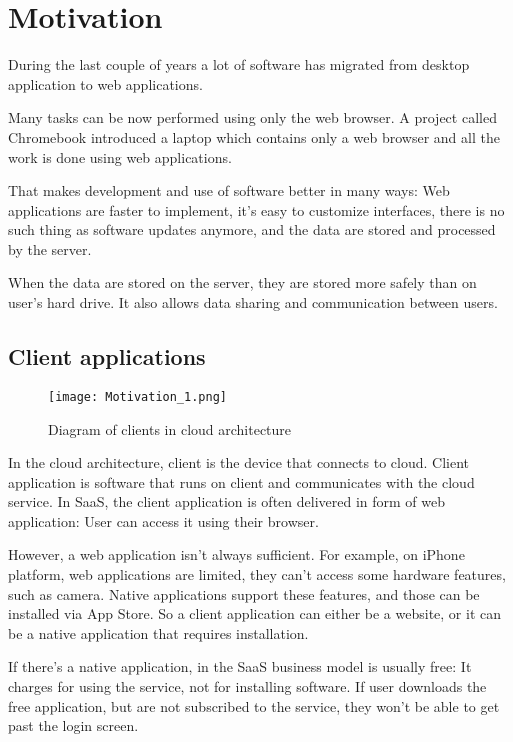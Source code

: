 \section{Motivation}

During the last couple of years a lot of software has migrated from desktop application to web applications.

Many tasks can be now performed using only the web browser. A project called Chromebook \citep{chromebook} introduced a laptop which contains only a web browser and all the work is done using web applications.

That makes development and use of software better in many ways: Web applications are faster to implement, it’s easy to customize interfaces, there is no such thing as software updates anymore, and the data are stored and processed by the server.

When the data are stored on the server, they are stored more safely than on user's hard drive. It also allows data sharing and communication between users.

\subsection{Client applications}

\begin{figure}[ht!]
\centering
\texttt{[image: Motivation\_1.png]}
\caption{Diagram of clients in cloud architecture \label{fig:1}}
\end{figure}

In the cloud architecture, client is the device that connects to cloud. Client application is software that runs on client and communicates with the cloud service. In SaaS, the client application is often delivered in form of web application: User can access it using their browser.

However, a web application isn't always sufficient. For example, on iPhone platform, web applications are limited, they can’t access some hardware features, such as camera. Native applications support these features, and those can be installed via App Store. So a client application can either be a website, or it can be a native application that requires installation.

If there's a native application, in the SaaS business model is usually free: It charges for using the service, not for installing software. If user downloads the free application, but are not subscribed to the service, they won't be able to get past the login screen. 

